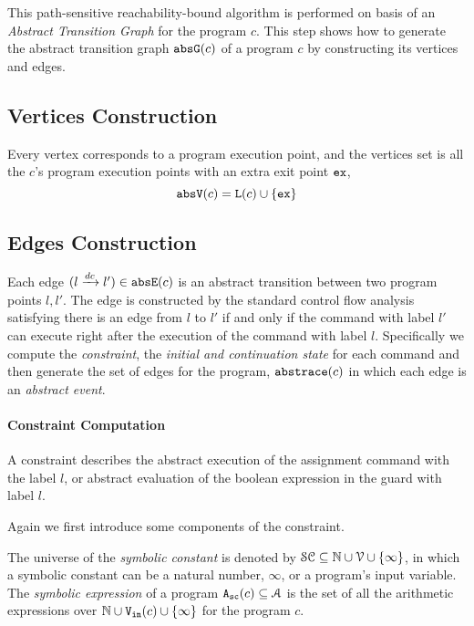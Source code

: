 This path-sensitive reachability-bound algorithm
is performed on basis of an \emph{Abstract Transition Graph} for the program $c$.
This step shows how to generate the abstract transition graph $\mathtt{abs}{\mathtt{G}}(c)$ of a
program $c$ by constructing its vertices and edges.

\subsection{Vertices Construction}
\label{sec:abs_prog-vertex}
Every 
vertex corresponds to a program execution point, 
and the vertices set is all the $c$'s program execution points with an extra exit point ${\mathtt{ex}}$, 
\[ 
 \mathtt{abs}{\mathtt{V}}(c) = \mathtt{L}(c)\cup\{{\mathtt{ex}}\}
 \]

\subsection{Edges Construction}
\label{sec:abs_prog-edge}
Each edge $(l \xrightarrow{dc} l') \in \mathtt{abs}{\mathtt{E}}(c)$ is an abstract transition
between two program points $l, l'$. 
The edge is constructed by the standard control flow analysis satisfying
there is an edge from $l$ to $l'$ if and only if
the command with label $l'$ can execute right after the execution of the command with label $l$.
Specifically we compute the \emph{constraint}, the \emph{initial and continuation state} for each command
and then generate the set of edges for the program, $\mathtt{abs}{\mathtt{trace}}(c)$ in which each edge is an
\emph{abstract event}.
\paragraph{Constraint Computation}
A constraint describes the abstract execution of the assignment command with the label $l$,
or abstract evaluation of the boolean expression in the guard with label $l$.

Again we first introduce some components of the constraint.

\begin{defn}
 \label{def:symbolic_expr}
The universe of the \emph{symbolic constant} is denoted by $\mathcal{SC} \subseteq \mathbb{N} \cup \mathcal{V} \cup \{\infty \}$, in which a symbolic constant can be a natural number, $\infty$, or a program's input variable.
 The \emph{symbolic expression} of a program ${\mathtt{A_{sc}}}(c) \subseteq \mathcal{A}$ is the set of all the arithmetic expressions over $\mathbb{N} \cup {\ensuremath{\mathtt{V_{\mathtt{in}}}}}(c) \cup \{\infty \}$ for the program $c$.
\end{defn}

